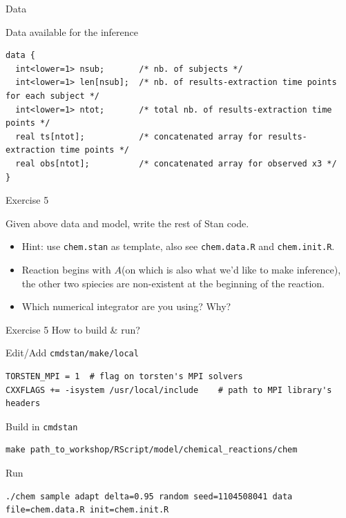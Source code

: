 \documentclass[presentation, allowframebreaks]{beamer}
\begin{document}
\begin{frame}[fragile,label={sec:orgf639330}]{Data}
 \begin{block}{Data available for the inference}
\begin{verbatim}
data {
  int<lower=1> nsub;       /* nb. of subjects */
  int<lower=1> len[nsub];  /* nb. of results-extraction time points for each subject */
  int<lower=1> ntot;       /* total nb. of results-extraction time points */
  real ts[ntot];           /* concatenated array for results-extraction time points */
  real obs[ntot];          /* concatenated array for observed x3 */
}
\end{verbatim}
\end{block}
\end{frame}

\begin{frame}[fragile,label={sec:orgc613ea2}]{Exercise 5}
 \begin{block}{Given above data and model, write the rest of Stan code.}
\begin{itemize}
\item Hint: use \texttt{chem.stan} as template, also see \texttt{chem.data.R} and \texttt{chem.init.R}.
\item Reaction begins with \(A\)(on which is also what we'd
like to make inference), the other two spiecies are
non-existent at the beginning of the reaction.
\item Which numerical integrator are you using? Why?
\end{itemize}
\end{block}
\end{frame}

\begin{frame}[fragile,label={sec:org94f9094}]{Exercise 5}
 How to build \& run?
\begin{block}{Edit/Add \texttt{cmdstan/make/local}}
\begin{verbatim}
TORSTEN_MPI = 1  # flag on torsten's MPI solvers
CXXFLAGS += -isystem /usr/local/include    # path to MPI library's headers
\end{verbatim}
\end{block}
\begin{block}{Build in \texttt{cmdstan}}
\begin{verbatim}
make path_to_workshop/RScript/model/chemical_reactions/chem
\end{verbatim}
\end{block}
\begin{block}{Run}
\begin{verbatim}
./chem sample adapt delta=0.95 random seed=1104508041 data file=chem.data.R init=chem.init.R
\end{verbatim}
\end{block}
\end{frame}
\end{document}
